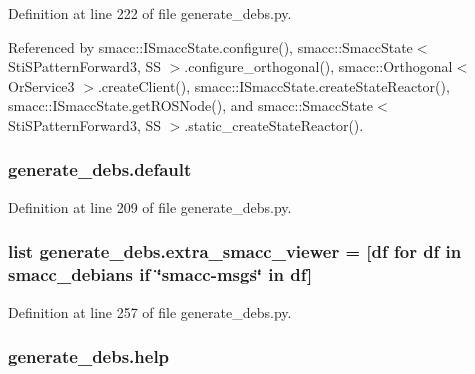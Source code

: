 Definition at line 222 of file generate\+\_\+debs.\+py.



Referenced by smacc\+::\+I\+Smacc\+State.\+configure(), smacc\+::\+Smacc\+State$<$ Sti\+S\+Pattern\+Forward3, S\+S $>$.\+configure\+\_\+orthogonal(), smacc\+::\+Orthogonal$<$ Or\+Service3 $>$.\+create\+Client(), smacc\+::\+I\+Smacc\+State.\+create\+State\+Reactor(), smacc\+::\+I\+Smacc\+State.\+get\+R\+O\+S\+Node(), and smacc\+::\+Smacc\+State$<$ Sti\+S\+Pattern\+Forward3, S\+S $>$.\+static\+\_\+create\+State\+Reactor().

\subsubsection[{\texorpdfstring{default}{default}}]{\setlength{\rightskip}{0pt plus 5cm}generate\+\_\+debs.\+default}\hypertarget{namespacegenerate__debs_a3d67a92b7eb3a59c397dc9fdd1c67558}{}\label{namespacegenerate__debs_a3d67a92b7eb3a59c397dc9fdd1c67558}


Definition at line 209 of file generate\+\_\+debs.\+py.

\subsubsection[{\texorpdfstring{extra\+\_\+smacc\+\_\+viewer}{extra_smacc_viewer}}]{\setlength{\rightskip}{0pt plus 5cm}list generate\+\_\+debs.\+extra\+\_\+smacc\+\_\+viewer = \mbox{[}df for df in {\bf smacc\+\_\+debians} if \char`\"{}smacc-\/msgs\char`\"{} in df\mbox{]}}\hypertarget{namespacegenerate__debs_aae153eaf5f6cddad5899c36fef7e1b10}{}\label{namespacegenerate__debs_aae153eaf5f6cddad5899c36fef7e1b10}


Definition at line 257 of file generate\+\_\+debs.\+py.

\subsubsection[{\texorpdfstring{help}{help}}]{\setlength{\rightskip}{0pt plus 5cm}generate\+\_\+debs.\+help}\hypertarget{namespacegenerate__debs_ab09f4294da5036d5f6881672de9ed9c7}{}\label{namespacegenerate__debs_ab09f4294da5036d5f6881672de9ed9c7}


